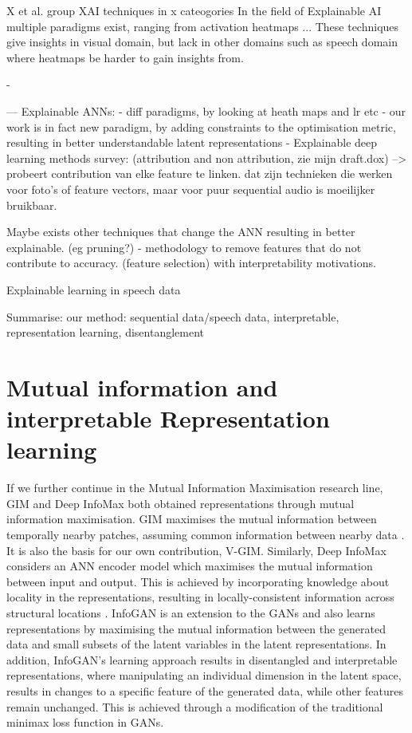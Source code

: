 	
	
	X et al. group XAI techniques in x cateogories
		In the field of Explainable AI multiple paradigms exist, ranging from activation heatmaps ...
	These techniques give insights in visual domain, but lack in other domains such as speech domain where heatmaps be harder to gain insights from.
	
		
	
	- 

---
Explainable ANNs:
	- diff paradigms, by looking at heath maps and lr etc
	- our work is in fact new paradigm, by adding constraints to the optimisation metric, resulting in better understandable latent representations
	- Explainable deep learning methods survey: \cite{baiExplainableDeepLearning2021} (attribution and non attribution, zie mijn draft.dox) --> probeert contribution van elke feature te linken. dat zijn technieken die werken voor foto's of feature vectors, maar voor puur sequential audio is moeilijker bruikbaar.
	
	Maybe exists other techniques that change the ANN resulting in better explainable. (eg pruning?)
	- methodology to remove features that do not contribute to accuracy. (feature selection) with interpretability motivations. \cite{glorfeldMethodologySimplificationInterpretation1996}
	
	
Explainable learning in speech data


Summarise: our method: sequential data/speech data, interpretable, representation learning, disentanglement

\section{Mutual information and interpretable Representation learning}

	If we further continue in the Mutual Information Maximisation research line, GIM and Deep InfoMax both obtained representations through mutual information maximisation. GIM maximises the mutual information between temporally nearby patches, assuming common information between nearby data \cite{lowePuttingEndEndtoEnd2020}. It is also the basis for our own contribution, V-GIM. Similarly, Deep InfoMax considers an ANN encoder model which maximises the mutual information between input and output. This is achieved by incorporating knowledge about locality in the representations, resulting in locally-consistent information across structural locations \cite{hjelmLearningDeepRepresentations2019}.
	InfoGAN \cite{chenInfoGANInterpretableRepresentation2016} is an extension to the GANs and also learns representations by maximising the mutual information between the generated data and small subsets of the latent variables in the latent representations. In addition, InfoGAN's learning approach results in disentangled and interpretable representations, where manipulating an individual dimension in the latent space, results in changes to a specific feature of the generated data, while other features remain unchanged. This is achieved through a modification of the traditional minimax loss function in GANs.
	
